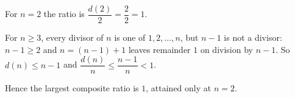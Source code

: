 For $n=2$ the ratio is $\dfrac{d(2)}{2}=\dfrac{2}{2}=1$.

For $n\ge3$, every divisor of $n$ is one of $1,2,\dots,n$, but $n-1$ is not a divisor: $n-1\ge2$ and $n=(n-1)+1$ leaves remainder $1$ on division by $n-1$. So $d(n)\le n-1$ and $\dfrac{d(n)}{n}\le\dfrac{n-1}{n}<1$.

Hence the largest composite ratio is $1$, attained only at $\boxed{n=2}$.
